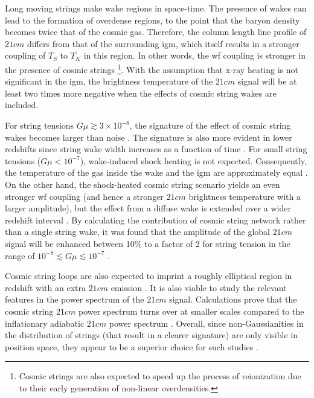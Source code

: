 \documentclass[12pt, TexShade, letterpaper]{report}
\begin{document}
Long moving strings make wake regions in space-time. The presence of wakes can lead to the formation of overdense regions, to the point that the baryon density becomes twice that of the cosmic gas. Therefore, the column length line profile of $21cm$ differs from that of the surrounding \gls{igm}, which itself results in a stronger coupling of $T_S$ to $T_K$ in this region. In other words, the \gls{wf} coupling is stronger in the presence of cosmic strings \footnote{Cosmic strings are also expected to speed up the process of reionization due to their early generation of non-linear overdensities\cite{corre_21cm_cmb}.}\cite{cosmic_string_oscar}. With the assumption that x-ray heating is not significant in the \gls{igm}, the brightness temperature of the $21cm$ signal will be at least two times more negative when the effects of cosmic string wakes are included. \par
For string tensions $G\mu \gtrsim 3\times 10^ {-8}$, the signature of the effect of cosmic string wakes becomes larger than noise \cite{WF_effect_oscar}. The signature is also more evident in lower redshifts since string wake width increases as a function of time \cite{cosmic_string_brandenberger}. For small string tensions ($G\mu< 10 ^{-7}$), wake-induced shock heating is not expected. Consequently, the temperature of the gas inside the wake and the \gls{igm} are approximately equal \cite{cosmic_string_oscar}. On the other hand, the shock-heated cosmic string scenario yields an even stronger \gls{wf} coupling (and hence a stronger $21cm$ brightness temperature with a larger amplitude), but the effect from a diffuse wake is extended over a wider redshift interval \cite{oscar_robert_shock, WF_effect_oscar, cosmic_string_oscar}. By calculating the contribution of cosmic string network rather than a single string wake, it was found that the amplitude of the global $21cm$ signal will be enhanced between 10\% to a factor of 2 for string tension in the range of $10^{-8}\lesssim G\mu\lesssim10^{-7}$  \cite{cosmic_string_oscar}.\par

Cosmic string loops are also expected to imprint a roughly elliptical region in redshift with an extra $21cm$ emission \cite{string_loop_robert}.
It is also viable to study the relevant features in the power spectrum of the $21cm$ signal. Calculations prove that the cosmic string $21cm$ power spectrum turns over at smaller scales compared to the inflationary adiabatic $21cm$ power spectrum \cite{super_string}. Overall, since non-Gaussianities in the distribution of strings (that result in a clearer signature) are only visible in position space, they appear to be a superior choice for such studies \cite{cosmic_string_brandenberger}.\par
\end{document}
